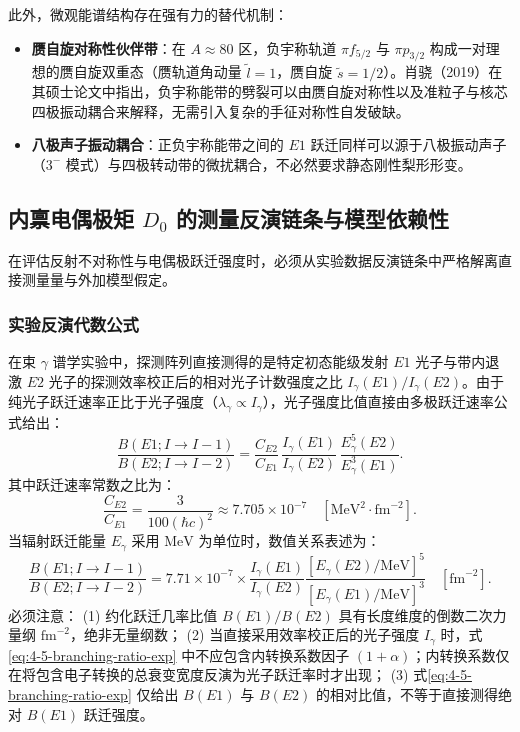 此外，微观能谱结构存在强有力的替代机制：
\begin{itemize}
\item \textbf{赝自旋对称性伙伴带}：在 $A\approx 80$ 区，负宇称轨道 $\pi f_{5/2}$ 与 $\pi p_{3/2}$ 构成一对理想的赝自旋双重态（赝轨道角动量 $\tilde{l}=1$，赝自旋 $\tilde{s}=1/2$）。肖骁（2019）在其硕士论文中指出，负宇称能带的劈裂可以由赝自旋对称性以及准粒子与核芯四极振动耦合来解释，无需引入复杂的手征对称性自发破缺。
\item \textbf{八极声子振动耦合}：正负宇称能带之间的 $E1$ 跃迁同样可以源于八极振动声子（$3^-$ 模式）与四极转动带的微扰耦合，不必然要求静态刚性梨形形变。
\end{itemize}

\subsection{内禀电偶极矩 $D_0$ 的测量反演链条与模型依赖性}\label{sec:4-5-5}

在评估反射不对称性与电偶极跃迁强度时，必须从实验数据反演链条中严格解离直接测量量与外加模型假定。

\subsubsection{实验反演代数公式}

在束 $\gamma$ 谱学实验中，探测阵列直接测得的是特定初态能级发射 $E1$ 光子与带内退激 $E2$ 光子的探测效率校正后的相对光子计数强度之比 $I_\gamma(E1)/I_\gamma(E2)$。由于纯光子跃迁速率正比于光子强度（$\lambda_\gamma \propto I_\gamma$），光子强度比值直接由多极跃迁速率公式给出：
\begin{equation}\label{eq:4-5-branching-ratio-exp}
\frac{B(E1; I \to I-1)}{B(E2; I \to I-2)} = \frac{C_{E2}}{C_{E1}} \, \frac{I_\gamma(E1)}{I_\gamma(E2)} \, \frac{E_\gamma^5(E2)}{E_\gamma^3(E1)} .
\end{equation}
其中跃迁速率常数之比为：
\begin{equation}\label{eq:4-5-rate-constant-ratio}
\frac{C_{E2}}{C_{E1}} = \frac{3}{100 (\hbar c)^2} \approx 7.705 \times 10^{-7} \quad [\mathrm{MeV}^2 \cdot \mathrm{fm}^{-2}] .
\end{equation}
当辐射跃迁能量 $E_\gamma$ 采用 $\mathrm{MeV}$ 为单位时，数值关系表述为：
\begin{equation}\label{eq:4-5-ratio-mev}
\frac{B(E1; I \to I-1)}{B(E2; I \to I-2)} = 7.71 \times 10^{-7} \times \frac{I_\gamma(E1)}{I_\gamma(E2)} \frac{[E_\gamma(E2)/\mathrm{MeV}]^5}{[E_\gamma(E1)/\mathrm{MeV}]^3} \quad [\mathrm{fm}^{-2}] .
\end{equation}
必须注意：
(1) 约化跃迁几率比值 $B(E1)/B(E2)$ 具有长度维度的倒数二次力量纲 $\mathrm{fm}^{-2}$，绝非无量纲数；
(2) 当直接采用效率校正后的光子强度 $I_\gamma$ 时，式\eqref{eq:4-5-branching-ratio-exp} 中不应包含内转换系数因子 $(1+\alpha)$；内转换系数仅在将包含电子转换的总衰变宽度反演为光子跃迁率时才出现；
(3) 式\eqref{eq:4-5-branching-ratio-exp} 仅给出 $B(E1)$ 与 $B(E2)$ 的相对比值，不等于直接测得绝对 $B(E1)$ 跃迁强度。

